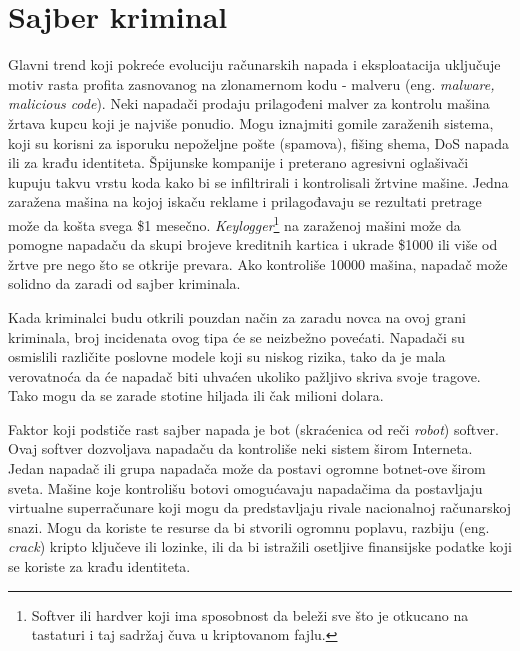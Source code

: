 \documentclass[a4paper]{article}
\theoremstyle{break}
\begin{document}
{\section{Sajber kriminal}
\label{sec:sajber_kriminal}

Glavni trend koji pokreće evoluciju računarskih napada i eksploatacija uključuje motiv rasta profita zasnovanog na zlonamernom kodu - malveru (eng. {\em malware, malicious code}). Neki napadači prodaju prilagođeni malver za kontrolu mašina žrtava kupcu koji je najviše ponudio. Mogu iznajmiti gomile zaraženih sistema, koji su korisni za isporuku nepoželjne pošte (spamova), fišing shema, DoS napada ili za krađu identiteta. Špijunske kompanije i preterano agresivni oglašivači kupuju takvu vrstu koda kako bi se infiltrirali i kontrolisali žrtvine mašine. Jedna zaražena mašina na kojoj iskaču reklame i prilagođavaju se rezultati pretrage može da košta svega \$1 mesečno. {\em Keylogger}\footnote{Softver ili hardver koji ima sposobnost da beleži sve što je otkucano na tastaturi i taj sadržaj čuva u kriptovanom fajlu.} na zaraženoj mašini može da pomogne napadaču da skupi brojeve kreditnih kartica i ukrade \$1000 ili više od žrtve pre nego što se otkrije prevara. Ako kontroliše 10000 mašina, napadač može solidno da zaradi od sajber kriminala. 

Kada kriminalci budu otkrili pouzdan način za zaradu novca na ovoj grani kriminala, broj incidenata ovog tipa će se neizbežno povećati. Napadači su osmislili različite poslovne modele koji su niskog rizika, tako da je mala verovatnoća da će napadač biti uhvaćen ukoliko pažljivo skriva svoje tragove. Tako mogu da se zarade stotine hiljada ili čak milioni dolara.

Faktor koji podstiče rast sajber napada je bot (skraćenica od reči \textit{robot}) softver. Ovaj softver dozvoljava napadaču da kontroliše neki sistem širom Interneta. Jedan napadač ili grupa napadača može da postavi ogromne botnet-ove širom sveta. Mašine koje kontrolišu botovi omogućavaju napadačima da postavljaju virtualne superračunare koji mogu da predstavljaju rivale nacionalnoj računarskoj snazi. Mogu da koriste te resurse da bi stvorili ogromnu poplavu, razbiju (eng. {\em crack}) kripto ključeve ili lozinke, ili da bi istražili osetljive finansijske podatke koji se koriste za krađu identiteta.

}
\end{document}
